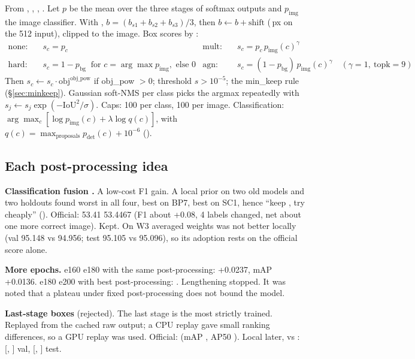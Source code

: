 From , , , . Let $p$ be the mean over the three stages of softmax outputs and $p_{\text{img}}$ the image classifier. With , $b=(b_{s1}+b_{s2}+b_{s3})/3$, then $b\leftarrow b+\text{shift}$ (\,px on the 512 input), clipped to the image. Box scores by :
\begin{align*}
\text{none:}\quad & s_c=p_c &
\text{mult:}\quad & s_c=p_c\,p_{\text{img}}(c)^{\gamma}\\
\text{hard:}\quad & s_c=1-p_{\text{bg}}\ \text{ for } c=\arg\max p_{\text{img}},\text{ else }0 &
\text{agn:}\quad & s_c=(1-p_{\text{bg}})\,p_{\text{img}}(c)^{\gamma}\quad(\gamma{=}1,\ \text{topk}{=}9)
\end{align*}
Then $s_c\leftarrow s_c\cdot\text{obj}^{\text{obj\_pow}}$ if obj\_pow $>0$; threshold $s>10^{-5}$; the min\_keep rule (\S\ref{sec:minkeep}). Gaussian soft-NMS per class picks the argmax repeatedly with $s_j\leftarrow s_j\exp(-\text{IoU}^2/\sigma)$. Caps: 100 per class, 100 per image. Classification: $\arg\max_c[\log p_{\text{img}}(c)+\lambda\log q(c)]$, with $q(c)=\max_{\text{proposals}}p_{\text{det}}(c)+10^{-6}$ ().

\subsection{Each post-processing idea}

\textbf{Classification fusion \lam.} A low-cost F1 gain. A local prior on two old models and two holdouts found  worst in all four,  best on BP7,  best on SC1, hence ``keep , try  cheaply'' (). Official: 53.41 \to{} 53.4467 (F1 about +0.08, 4 labels changed, net about one more correct image). Kept. On W3 averaged weights  was not better locally (val  95.148 vs  94.956; test 95.105 vs 95.096), so its adoption rests on the official score alone.

\textbf{More epochs.} e160 \to{} e180 with the same post-processing: \dm{} +0.0237, mAP +0.0136. e180 \to{} e200 with best post-processing: . Lengthening stopped. It was noted that a plateau under fixed post-processing does not bound the model.

\textbf{Last-stage boxes} (rejected). The last stage is the most strictly trained. Replayed from the cached raw output; a CPU replay gave small ranking differences, so a GPU replay was used. Official:  (mAP , AP50 ). Local later,  vs :  [, ] val,  [, ] test.


